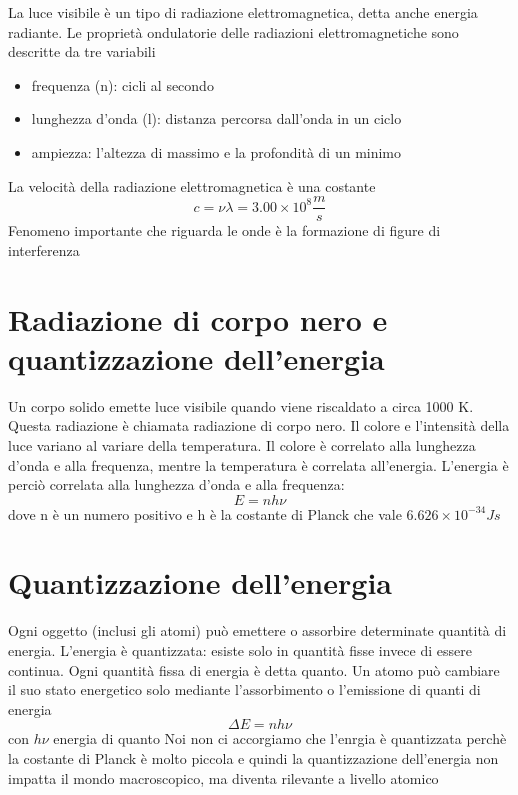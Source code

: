 \documentclass[a4paper,11pt]{report}
\begin{document}
La luce visibile è un tipo di radiazione elettromagnetica, detta anche energia radiante. Le proprietà ondulatorie delle radiazioni elettromagnetiche sono descritte da tre variabili
\begin{itemize}
	\item frequenza (n): cicli al secondo
	\item lunghezza d'onda (l): distanza percorsa dall'onda in un ciclo
	\item ampiezza: l'altezza di massimo e la profondità di un minimo
\end{itemize}
La velocità della radiazione elettromagnetica è una costante
\begin{equation*}
	c = \nu \lambda = 3.00 \times 10^8 \frac{m}{s}
\end{equation*}
Fenomeno importante che riguarda le onde è la formazione di figure di interferenza

\section{Radiazione di corpo nero e quantizzazione dell'energia}

Un corpo solido emette luce visibile quando viene riscaldato a circa 1000 K. Questa radiazione è chiamata radiazione di corpo nero. \newline
Il colore e l'intensità della luce variano al variare della temperatura. Il colore è correlato alla lunghezza d'onda e alla frequenza, mentre la temperatura è correlata all'energia. L'energia è perciò correlata alla lunghezza d'onda e alla frequenza:
\begin{equation*}
	E = nh\nu
\end{equation*}
dove n è un numero positivo e h è la costante di Planck che vale $6.626 \times 10^{-34} Js$

\section{Quantizzazione dell'energia}

Ogni oggetto (inclusi gli atomi) può emettere o assorbire determinate quantità di energia. L'energia è quantizzata: esiste solo in quantità fisse invece di essere continua. Ogni quantità fissa di energia è detta quanto. Un atomo può cambiare il suo stato energetico solo mediante l'assorbimento o l'emissione di quanti di energia
\begin{equation*}
	\Delta E = nh \nu
\end{equation*}
con $h\nu$ energia di quanto \newline
Noi non ci accorgiamo che l'enrgia è quantizzata perchè la costante di Planck è molto piccola e quindi la quantizzazione dell'energia non impatta il mondo macroscopico, ma diventa rilevante a livello atomico
\end{document}
